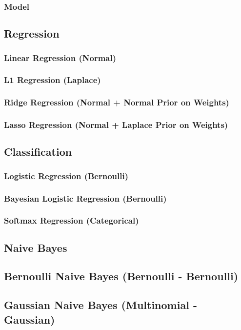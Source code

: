 \documentclass{article}
\begin{document}
\subsubsection{Model}

\subsection{Regression}
\subsubsection{Linear Regression (Normal)}
\subsubsection{L1 Regression (Laplace)}
\subsubsection{Ridge Regression (Normal + Normal Prior on Weights)}
\subsubsection{Lasso Regression (Normal + Laplace Prior on Weights)}

\subsection{Classification}
\subsubsection{Logistic Regression (Bernoulli)}
\subsubsection{Bayesian Logistic Regression (Bernoulli)}
\subsubsection{Softmax Regression (Categorical)}

\subsection{Naive Bayes}
\subsection{Bernoulli Naive Bayes (Bernoulli - Bernoulli)}
\subsection{Gaussian Naive Bayes (Multinomial - Gaussian)}
\end{document}
